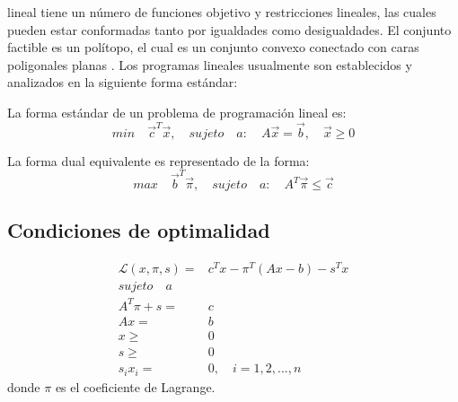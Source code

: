  lineal tiene un número de funciones objetivo y restricciones lineales, las cuales pueden estar conformadas tanto por igualdades como desigualdades.
%
El conjunto factible es un polítopo, el cual es un conjunto convexo conectado con caras poligonales planas \cite{nocedal2006sequential}. 
%
Los programas lineales usualmente son establecidos y analizados en la siguiente forma estándar:



La forma estándar de un problema de programación lineal es:
\begin{equation}\label{estandar}
min \quad \vec{c}^T \vec{x}, \quad sujeto \quad a: \quad A\vec{x} = \vec{b}, \quad \vec{x} \geq 0
\end{equation}

La forma dual equivalente es representado de la forma:
\begin{equation}\label{dual}
max \quad \vec{b}^T \vec{\pi}, \quad sujeto \quad a: \quad A^T \vec{\pi} \leq \vec{c}
\end{equation}

\subsection{Condiciones de optimalidad}
\begin{equation}
\begin{split}
\mathcal{L}(x, \pi, s) =& c^T x - \pi^T ( Ax - b) - s^T x \\
sujeto \quad a \\
A^T \pi + s =& c \\
Ax =& b \\
x \geq& 0 \\
s \geq& 0 \\
s_i x_i =& 0, \quad i=1,2,...,n
\end{split}
\end{equation}
donde $\pi$ es el coeficiente de Lagrange.
